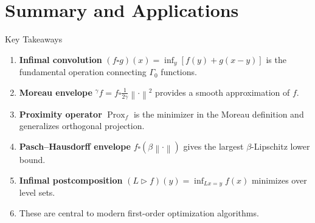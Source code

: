 \documentclass[aspectratio=169,10pt]{beamer}
\newcommand{\norm}[1]{\left\|#1\right\|}
\newcommand{\Prox}{\operatorname{Prox}}
\newcommand{\co}{\square}
\newcommand{\me}[1]{{}^{#1}\!f}
\begin{document}
\section{Summary and Applications}

\begin{frame}{Key Takeaways}

  \begin{enumerate}
    \item[(1)] \textbf{Infimal convolution} $(f \co g)(x) = \inf_y [f(y) + g(x-y)]$
      is the fundamental operation connecting $\Gamma_0$ functions.

    \vspace{0.25cm}

    \item[(2)] \textbf{Moreau envelope} $\me{\gamma} = f \co \frac{1}{2\gamma} \norm{\cdot}^2$
      provides a smooth approximation of $f$.

    \vspace{0.25cm}

    \item[(3)] \textbf{Proximity operator} $\Prox_f$ is the minimizer in the Moreau
      definition and generalizes orthogonal projection.

    \vspace{0.25cm}

    \item[(4)] \textbf{Pasch--Hausdorff envelope} $f \co (\beta \norm{\cdot})$ gives
      the largest $\beta$-Lipschitz lower bound.

    \vspace{0.25cm}

    \item[(5)] \textbf{Infimal postcomposition} $(L \triangleright f)(y) = \inf_{Lx=y} f(x)$
      minimizes over level sets.

    \vspace{0.25cm}

    \item[(6)] These are central to modern first-order optimization algorithms.
  \end{enumerate}

\end{frame}
\end{document}
